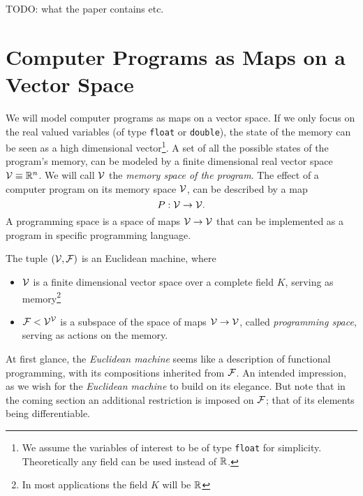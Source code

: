 TODO: what the paper contains etc.

\section{Computer Programs as Maps on a Vector Space}

We will model computer programs as maps on a vector space. If
we only focus on the real valued variables (of type \texttt{float} or
\texttt{double}), the state of the memory can be seen as a high
dimensional vector\footnote{We assume the variables of interest to be of type \texttt{float} for
  simplicity. Theoretically any field can be used instead of $\mathbb{R}$.}. 
A set of all the possible states of the program's memory,
can be modeled by a finite dimensional real vector space $\mathcal{V}\equiv \mathbb{R}^n$. We
will call $\mathcal{V}$ the \emph{memory space of the program}. The effect of a computer
program on its memory space $\mathcal{V}$, can be described by a map
\begin{equation}
  \label{eq:map}
  P:\mathcal{V}\to \mathcal{V}.
\end{equation}
A programming space is a space of maps $\mathcal{V}\to\mathcal{V}$ that can be implemented as a
program in specific programming language. 
\begin{definition} The tuple $(\mathcal{V},\mathcal{F})$ is an Euclidean machine, where
  \begin{itemize}
  \item
  $\mathcal{V}$ is a finite dimensional vector space over a complete field $K$, serving
  as memory\footnote{In most applications the field $K$ will
    be $\mathbb{R}$}
  \item
  $\mathcal{F}< \mathcal{V}^{\mathcal{V}}$ is a subspace of the space of maps $\mathcal{V}\to \mathcal{V}$, called \emph{programming space}, serving as actions on the memory.
  \end{itemize}  
\end{definition}

At first glance, the \emph{Euclidean machine} seems like a description of functional programming, with its compositions inherited from $\mathcal{F}$. An intended impression, as we wish for the \emph{Euclidean machine} to build on its elegance. But note that in the coming section an additional restriction is imposed on $\mathcal{F}$; that of its elements being differentiable.

